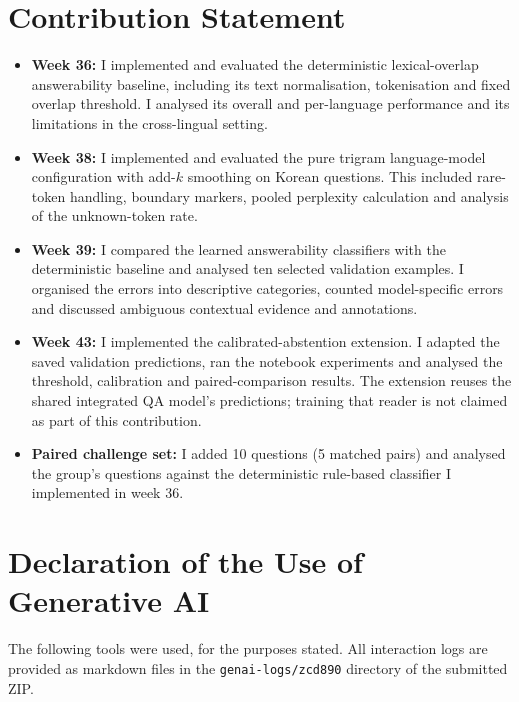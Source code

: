\documentclass[11pt]{article}
\begin{document}
\section*{Contribution Statement}

\begin{itemize}
    \item \textbf{Week 36:}
    I implemented and evaluated the deterministic lexical-overlap answerability baseline, including its text normalisation, tokenisation and fixed overlap threshold. I analysed its overall and per-language performance and its limitations in the cross-lingual setting.

    \item \textbf{Week 38:}
    I implemented and evaluated the pure trigram language-model configuration with add-$k$ smoothing on Korean questions. This included rare-token handling, boundary markers, pooled perplexity calculation and analysis of the unknown-token rate.

    \item \textbf{Week 39:}
    I compared the learned answerability classifiers with the deterministic baseline and analysed ten selected validation examples. I organised the errors into descriptive categories, counted model-specific errors and discussed ambiguous contextual evidence and annotations.

    \item \textbf{Week 43:}
    I implemented the calibrated-abstention extension. I adapted the saved validation predictions, ran the notebook experiments and analysed the threshold, calibration and paired-comparison results. The extension reuses the shared integrated QA model's predictions; training that reader is not claimed as part of this contribution.

    \item \textbf{Paired challenge set:}
    I added 10 questions (5 matched pairs) and analysed the group's questions against the deterministic rule-based classifier I implemented in week 36.
\end{itemize}

\section*{Declaration of the Use of Generative AI}

\noindent
The following tools were used, for the purposes stated. All interaction logs are provided as markdown files in the \texttt{genai-logs/zcd890} directory of the submitted ZIP.
\end{document}
